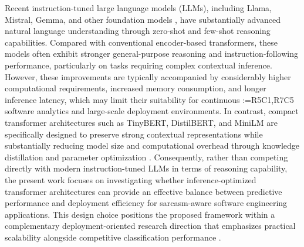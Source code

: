 \documentclass[a4paper,fleqn]{cas-sc}
\makeatletter
\newif\iftracked
\newcommand{\rv@setcolour}[1]{%
  \IfStrEq{#1}{R7C7}{\color{rvEdit}}{%
    \IfSubStr{#1}{R5}{\IfSubStr{#1}{R7}{\color{rvBoth}}{\color{rvFive}}}{\color{rvSeven}}}}
\newcommand{\rv@tag}[1]{\textsuperscript{\sffamily\bfseries\scriptsize[\StrSubstitute{#1}{,}{, }]}\,}
\newcommand{\rv@recordone}[1]{%
  \edef\rv@i{#1}%
  \ifcsdef{rv@n@\rv@i}{}{\csgdef{rv@n@\rv@i}{0}}%
  \csxdef{rv@n@\rv@i}{\the\numexpr\csuse{rv@n@\rv@i}+1\relax}%
  \begingroup\edef\@currentlabel{\rv@i}\label{rv:\rv@i:\csuse{rv@n@\rv@i}}\endgroup}
\newcommand{\rv@record}[1]{\@for\rv@id:=#1\do{\expandafter\rv@recordone\expandafter{\rv@id}}}
\DeclareRobustCommand{\rcdel}[2]{\rv@record{#1}\iftracked{\rv@setcolour{#1}\rv@tag{#1}\rv@strike{#2}}\else\unskip\fi}
\makeatother
\begin{document}
Recent instruction-tuned large language models (LLMs), including Llama, Mistral, Gemma, and other foundation models \citep{bhargava2026impact,li2026clue,schmitt2026enhancing}, have substantially advanced natural language understanding through zero-shot and few-shot reasoning capabilities. Compared with conventional encoder-based transformers, these models often exhibit stronger general-purpose reasoning and instruction-following performance, particularly on tasks requiring complex contextual inference. However, these improvements are typically accompanied by considerably higher computational requirements, increased memory consumption, and longer inference latency, which may limit their suitability for continuous \rcdel{R5C1,R7C5}{real-time} software analytics and large-scale deployment environments. In contrast, compact transformer architectures such as TinyBERT, DistilBERT, and MiniLM are specifically designed to preserve strong contextual representations while substantially reducing model size and computational overhead through knowledge distillation and parameter optimization \citep{yang2026evaluating}. Consequently, rather than competing directly with modern instruction-tuned LLMs in terms of reasoning capability, the present work focuses on investigating whether inference-optimized transformer architectures can provide an effective balance between predictive performance and deployment efficiency for sarcasm-aware software engineering applications. This design choice positions the proposed framework within a complementary deployment-oriented research direction that emphasizes practical scalability alongside competitive classification performance \citep{zhou2026ramsd}.
\end{document}
